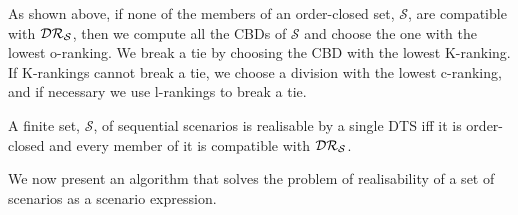 \noindent
As shown above, if none of the members of an order-closed set,
$\mathcal{S}$, are compatible with $\mathcal{DR}_{\mathcal{S}}$, then we compute all the
CBDs of $\mathcal{S}$ and
choose the one with the lowest o-ranking.
We break a tie by choosing the CBD with the lowest
K-ranking.
If K-rankings cannot break a tie, we
choose a division with the lowest c-ranking, and if necessary we use
l-rankings to break a tie.
\begin{theorem}
\label{thm-realisable}
A finite set, $\mathcal{S}$, of sequential scenarios is
realisable by a single DTS iff it is order-closed and every member of
it is compatible with $\mathcal{DR}_{\mathcal{S}}$.
\end{theorem}
\noindent
We now present an algorithm
that solves the problem of realisability
of a set of scenarios as a scenario expression.





